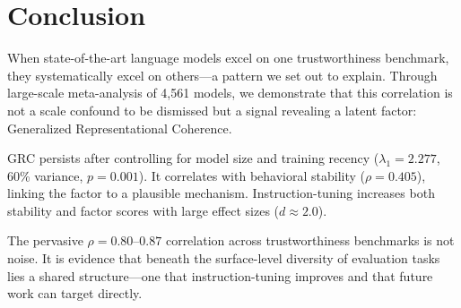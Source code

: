 \section{Conclusion}

When state-of-the-art language models excel on one trustworthiness benchmark, they systematically excel on others---a pattern we set out to explain. Through large-scale meta-analysis of 4,561 models, we demonstrate that this correlation is not a scale confound to be dismissed but a signal revealing a latent factor: Generalized Representational Coherence.

GRC persists after controlling for model size and training recency ($\lambda_1 = 2.277$, 60\% variance, $p = 0.001$). It correlates with behavioral stability ($\rho = 0.405$), linking the factor to a plausible mechanism. Instruction-tuning increases both stability and factor scores with large effect sizes ($d \approx 2.0$).

The pervasive $\rho = 0.80$--$0.87$ correlation across trustworthiness benchmarks is not noise. It is evidence that beneath the surface-level diversity of evaluation tasks lies a shared structure---one that instruction-tuning improves and that future work can target directly.

